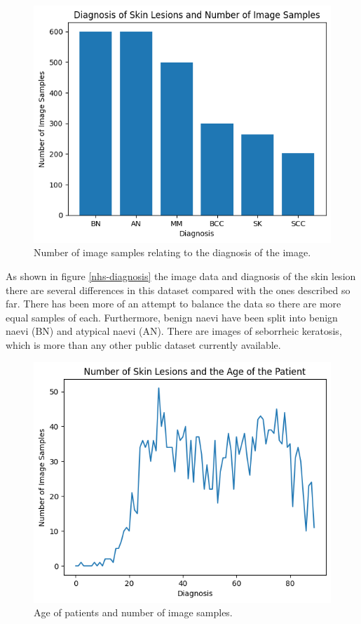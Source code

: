 \begin{figure}
	\centering
	\includegraphics[scale=0.8]{images/nhs/nhs-diagnosis.png}
	\caption{Number of image samples relating to the diagnosis of the image.} 
\end{figure}\label{nhs-diagnosis}

 As shown in figure \ref{nhs-diagnosis} the image data and diagnosis of the skin lesion there are several differences in this dataset compared with the ones described so far. There has been more of an attempt to balance the data so there are more equal samples of each. Furthermore, benign naevi have been split into benign naevi (BN) and atypical naevi (AN). There are images of seborrheic keratosis, which is more than any other public dataset currently available. 

 \begin{figure}
	\centering
	\includegraphics[scale=0.8]{images/nhs/nhs-age.png}
	\caption{Age of patients and number of image samples.} 
\end{figure}\label{nhs-age}

